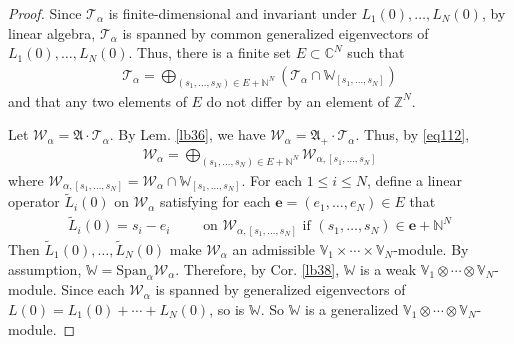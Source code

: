 \documentclass[11pt,b5paper,notitlepage]{article}
\theoremstyle{definition}
\theoremstyle{plain}
\newcommand{\fk}{\mathfrak}
\newcommand{\mc}{\mathcal}
\newcommand{\wtd}{\widetilde}
\newcommand{\Span}{\mathrm{Span}}
\newcommand{\mbf}{\mathbf}
\newcommand{\Vbb}{\mathbb V}
\newcommand{\Wbb}{\mathbb W}
\newcommand{\Cbb}{\mathbb C}
\newcommand{\Nbb}{\mathbb N}
\newcommand{\Zbb}{\mathbb Z}
\newcommand{\<}{\left\langle}
\renewcommand{\>}{\right\rangle}
\numberwithin{equation}{section}
\begin{document}
\begin{proof}








Since $\mc T_\alpha$ is finite-dimensional and  invariant under $L_1(0),\dots,L_N(0)$, by linear algebra, $\mc T_\alpha$ is spanned by common generalized eigenvectors of $L_1(0),\dots,L_N(0)$. Thus, there is a finite set $E\subset\Cbb^N$ such that 
\begin{align*}
\mc T_\alpha=\bigoplus_{(s_1,\dots,s_N)\in E+\Nbb^N} (\mc T_\alpha\cap\Wbb_{[s_1,\dots,s_N]})
\end{align*}
and that any two elements of $E$ do not differ by an element of $\Zbb^N$.



Let $\mc W_\alpha=\fk A\cdot \mc T_\alpha$. By Lem. \ref{lb36}, we have $\mc W_\alpha=\fk A_+\cdot\mc T_\alpha$. Thus, by \eqref{eq112},
\begin{align*}
\mc W_\alpha=\bigoplus_{(s_1,\dots,s_N)\in E+\Nbb^N} \mc W_{\alpha,[s_1,\dots,s_N]}
\end{align*}
where $\mc W_{\alpha,[s_1,\dots,s_N]}=\mc W_\alpha\cap\Wbb_{[s_1,\dots,s_N]}$. For each $1\leq i\leq N$, define a linear operator $\wtd L_i(0)$ on $\mc W_\alpha$ satisfying for each $\mbf e=(e_1,\dots,e_N)\in E$ that
\begin{align*}
\wtd L_i(0)=s_i-e_i \qquad\text{ on }\mc W_{\alpha,[s_1,\dots,s_N]}\text{ if } (s_1,\dots,s_N)\in\mbf e+\Nbb^N
\end{align*} 
Then $\wtd L_1(0),\dots,\wtd L_N(0)$ make $\mc W_\alpha$ an admissible $\Vbb_1\times\cdots\times\Vbb_N$-module. By assumption, $\Wbb=\Span_\alpha\mc W_\alpha$. Therefore, by Cor.  \ref{lb38}, $\Wbb$ is a weak $\Vbb_1\otimes\cdots\otimes\Vbb_N$-module. Since each $\mc W_\alpha$ is spanned by generalized eigenvectors of $L(0)=L_1(0)+\cdots+L_N(0)$, so is $\Wbb$. So $\Wbb$ is a generalized $\Vbb_1\otimes\cdots\otimes\Vbb_N$-module.
\end{proof}
\end{document}
